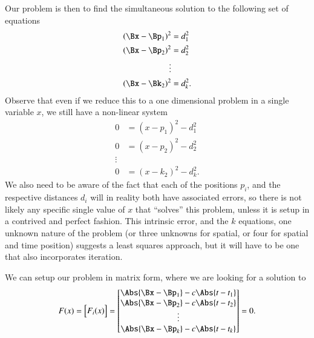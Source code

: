 Our problem is then to find the simultaneous solution to the following set of equations
\begin{equation}\label{eqn:relativisticElectrodynamicsA1:300}
\begin{aligned}
(\Bx - \Bp_1)^2 &= d_1^2 \\
(\Bx - \Bp_2)^2 &= d_2^2 \\
\vdots \\
(\Bx - \Bk_2)^2 &= d_k^2.
\end{aligned}
\end{equation}
Observe that even if we reduce this to a one dimensional problem in a single variable \(x\), we still have a non-linear system
\begin{equation}\label{eqn:relativisticElectrodynamicsA1:300b}
\begin{aligned}
0 &= (x - p_1)^2 - d_1^2 \\
0 &= (x - p_2)^2 - d_2^2 \\
\vdots \\
0 &= (x - k_2)^2 - d_k^2.
\end{aligned}
\end{equation}
We also need to be aware of the fact that each of the positions \(p_i\), and the respective distances \(d_i\) will in reality both have associated errors, so there is not likely any specific single value of \(x\) that ``solves'' this problem, unless it is setup in a contrived and perfect fashion.  This intrinsic error, and the \(k\) equations, one unknown nature of the problem (or three unknowns for spatial, or four for spatial and time position) suggests a least squares approach, but it will have to be one that also incorporates iteration.

We can setup our problem in matrix form, where we are looking for a solution to 
\begin{equation}\label{eqn:relativisticElectrodynamicsA1:310}
F(x) = 
\begin{bmatrix}
F_i(x)
\end{bmatrix}
=
\begin{bmatrix}
\Abs{\Bx - \Bp_1} - c \Abs{ t - t_1 } \\
\Abs{\Bx - \Bp_2} - c \Abs{ t - t_2 } \\
\vdots \\
\Abs{\Bx - \Bp_k} - c \Abs{ t - t_k } \\
\end{bmatrix}
= 0.
\end{equation}

